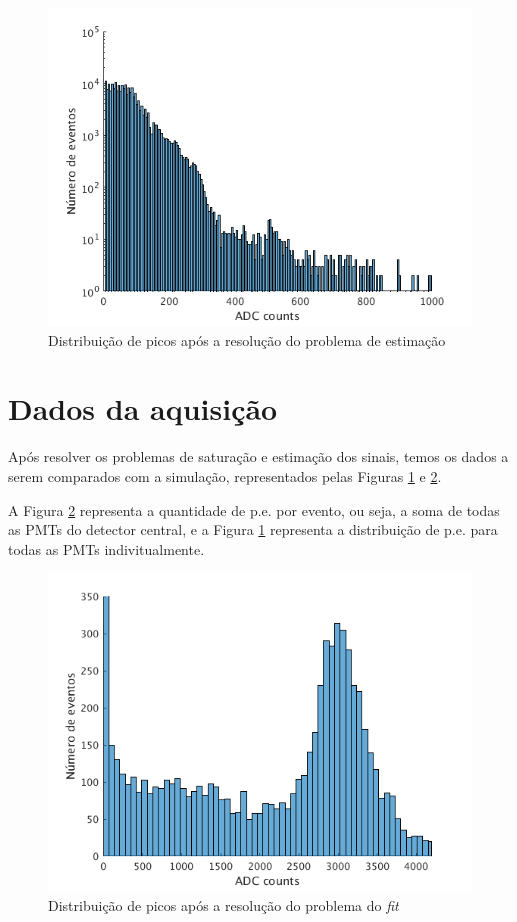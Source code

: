 \begin{figure}[H]
	\centering
	\includegraphics[width=14cm]{textuais/dadosreais/figuras/peakdist.png}
	\caption{Distribuição de picos após a resolução do problema de estimação}
	\label{fig:peakdist}
\end{figure}


\section{Dados da aquisição}

Após resolver os problemas de saturação e estimação dos sinais, temos os dados  a serem comparados com a simulação, representados pelas Figuras \ref{fig:peakdist} e \ref{fig:hist_evt}.

A Figura \ref{fig:hist_evt} representa a quantidade de p.e. por evento, ou seja, a soma de todas as PMTs do detector central, e a Figura \ref{fig:peakdist} representa a distribuição de p.e. para todas as PMTs indivitualmente.
\\

\begin{figure}[H]
	\centering
	\includegraphics[width=14cm]{textuais/dadosreais/figuras/hist_evt.png}
	\caption{Distribuição de picos após a resolução do problema do \emph{fit}}
	\label{fig:hist_evt}
\end{figure}

